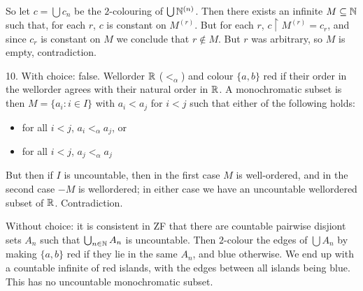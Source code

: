 \documentclass[10pt]{article}
\begin{document}
So let $c = \bigcup c_n$ be the $2$-colouring of $\bigcup \mathbb{N}^{(n)}$. Then there exists an infinite $M\subseteq \mathbb{N}$ such that, for each $r$, $c$ is constant on $M^{(r)}$. But for each $r$, $c\restriction M^{(r)} = c_r$, and since $c_r$ is constant on $M$ we conclude that $r \not \in M$. But $r$ was arbitrary, so $M$ is empty, contradiction.

10. With choice: false. Wellorder $\mathbb{R}$ ($<_\alpha$) and colour $\{a,b\}$ red if their order in the wellorder agrees with their natural order in $\mathbb{R}$. A monochromatic subset is then $M = \{a_i : i \in I\}$ with $a_i < a_j$ for $i < j$ such that either of the following holds:
\begin{itemize}
    \item for all $i < j$, $a_i <_\alpha a_j$, or
    \item for all $i < j$, $a_j <_\alpha a_j$
\end{itemize}
But then if $I$ is uncountable, then in the first case $M$ is well-ordered, and in the second case $-M$ is wellordered; in either case we have an uncountable wellordered subset of $\mathbb{R}$. Contradiction.

Without choice: it is consistent in ZF that there are countable pairwise disjiont sets $A_n$ such that $\bigcup_{n\in\mathbb{N}}A_n$ is uncountable. Then $2$-colour the edges of $\bigcup A_n$ by making $\{a,b\}$ red if they lie in the same $A_n$, and blue otherwise. We end up with a countable infinite of red islands, with the edges between all islands being blue. This has no uncountable monochromatic subset.
\end{document}
